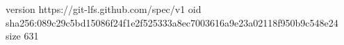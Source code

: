 version https://git-lfs.github.com/spec/v1
oid sha256:089c29c5bd15086f24f1e2f525333a8ec7003616a9e23a02118f950b9c548e24
size 631
